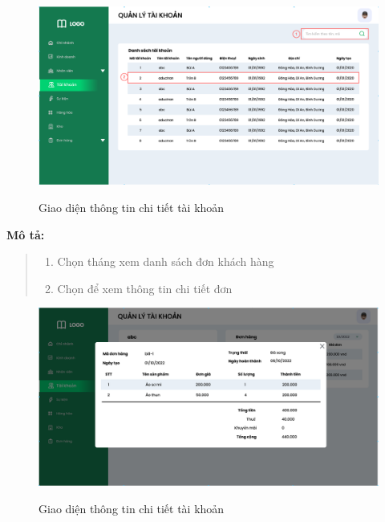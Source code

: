             \begin{figure}[!htp]
                \centering
                \includegraphics[width=12cm]{img/UI/admin/account.png}
                \label{30}
                \newline
                \caption{Giao diện thông tin chi tiết tài khoản}
            \end{figure}
            \textbf{Mô tả:}  
            \begin{quote}
                \begin{enumerate}
                    \item Chọn tháng xem danh sách đơn khách hàng
                    \item Chọn để xem thông tin chi tiết đơn
                \end{enumerate}
            \end{quote}
            \begin{figure}[!htp]
                \centering
                \includegraphics[width=12cm]{img/UI/admin/account_order.png}
                \label{31}
                \newline
                \caption{Giao diện thông tin chi tiết tài khoản}
            \end{figure}
    

